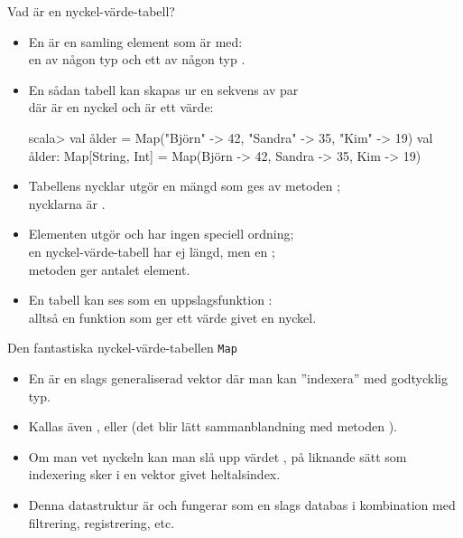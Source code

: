 

\begin{Slide}{Vad är en nyckel-värde-tabell?}\SlideFontSmall
\begin{itemize}
\item En  är en samling element som är  med:\\
en  av någon typ  och ett  av någon typ .
\item En sådan tabell kan skapas ur en sekvens av par \\
där  är en nyckel och  är ett värde:
\begin{REPL}
scala> val ålder = Map("Björn" -> 42, "Sandra" -> 35, "Kim" -> 19)
val ålder: Map[String, Int] = Map(Björn -> 42, Sandra -> 35, Kim -> 19)
\end{REPL}
\item Tabellens nycklar utgör en mängd som ges av metoden ;\\
nycklarna är .
\item Elementen utgör  och har ingen speciell ordning;
\\en nyckel-värde-tabell har ej längd, men en ;\\metoden {} ger antalet element.
\pause
\item En tabell kan ses som en uppslagsfunktion :\\alltså en funktion  som ger ett värde givet en nyckel.
\end{itemize}
\end{Slide}


\begin{Slide}{Den fantastiska nyckel-värde-tabellen \texttt{Map}}\SlideFontSmall
\begin{itemize}
\item En   är en slags generaliserad vektor där man kan ''indexera'' med godtycklig typ.

\item Kallas även \href{https://sv.wikipedia.org/wiki/Hashtabell}{} ,   eller   (det blir lätt sammanblandning med metoden ).

\item Om man vet nyckeln kan man slå upp värdet , på liknande sätt som indexering sker i en vektor givet heltalsindex.

\item Denna datastruktur är  och fungerar som en slags databas i kombination med filtrering, registrering, etc.
\end{itemize}
\end{Slide}


